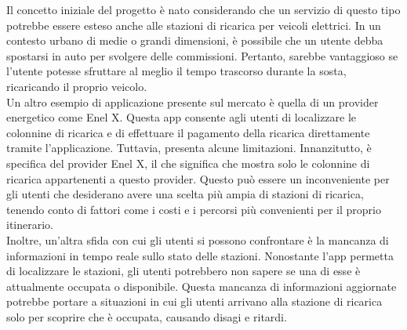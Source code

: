 Il concetto iniziale del progetto è nato considerando che un servizio di questo tipo potrebbe essere esteso anche
alle stazioni di ricarica per veicoli elettrici. In un contesto urbano di medie o grandi dimensioni, è possibile
che un utente debba spostarsi in auto per svolgere delle commissioni. Pertanto, sarebbe vantaggioso se l'utente
potesse sfruttare al meglio il tempo trascorso durante la sosta, ricaricando il proprio veicolo.\\


Un altro esempio di applicazione presente sul mercato è quella di un provider energetico come Enel X.
Questa app consente agli utenti di localizzare le colonnine di ricarica e di effettuare il pagamento della
ricarica direttamente tramite l'applicazione. Tuttavia, presenta alcune limitazioni. Innanzitutto,
è specifica del provider Enel X, il che significa che mostra solo le colonnine di ricarica appartenenti
a questo provider. Questo può essere un inconveniente per gli utenti che desiderano avere una scelta più
ampia di stazioni di ricarica, tenendo conto di fattori come i costi e i percorsi più convenienti per il proprio itinerario.\\

Inoltre, un'altra sfida con cui gli utenti si possono confrontare è la mancanza di informazioni in tempo
reale sullo stato delle stazioni. Nonostante l'app permetta di localizzare le stazioni, gli utenti potrebbero
non sapere se una di esse è attualmente occupata o disponibile. Questa mancanza di informazioni aggiornate
potrebbe portare a situazioni in cui gli utenti arrivano alla stazione di ricarica solo per scoprire che è
occupata, causando disagi e ritardi.





